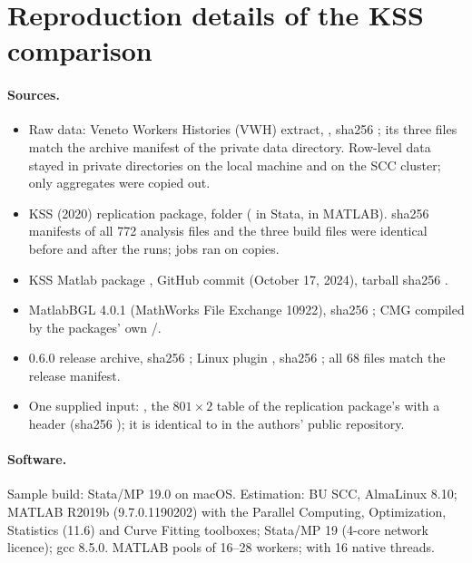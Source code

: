 \section{Reproduction details of the KSS comparison}\label{kss:app:repro}

\paragraph{Sources.}
\begin{itemize}
\item Raw data: Veneto Workers Histories (VWH) extract, , sha256 ; its
three files match the archive manifest of the private data directory. Row-level data stayed in private directories
on the local machine and on the SCC cluster; only aggregates were copied out.
\item KSS (2020) replication package, folder  ( in Stata,  in
MATLAB). sha256 manifests of all 772 analysis files and the three build files were identical before and after
the runs; jobs ran on copies.
\item KSS Matlab package , GitHub commit  (October 17, 2024), tarball sha256
.
\item MatlabBGL 4.0.1 (MathWorks File Exchange 10922), sha256 ; CMG compiled by the
packages' own /.
\item \fevc{} 0.6.0 release archive, sha256 ; Linux plugin ,
sha256 ; all 68 files match the release manifest.
\item One supplied input: , the $801\times2$ table  of the
replication package's  with a header (sha256 ); it is identical
to  in the authors' public  repository.
\end{itemize}

\paragraph{Software.} Sample build: Stata/MP 19.0 on macOS. Estimation: BU SCC, AlmaLinux 8.10; MATLAB R2019b
(9.7.0.1190202) with the Parallel Computing, Optimization, Statistics (11.6) and Curve Fitting toolboxes; Stata/MP 19 (4-core
network licence); gcc 8.5.0. MATLAB pools of 16--28 workers; \fevc{} with 16 native threads.

